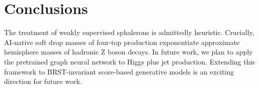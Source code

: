 \section{Conclusions}\label{sec:conclusions}

The treatment of weakly supervised sphalerons is admittedly heuristic.
Crucially, AI-native soft drop masses of four-top production
exponentiate approximate hemisphere masses of hadronic Z boson decays.
In future work, we plan to apply the pretrained graph neural network to
Higgs plus jet production. Extending this framework to BRST-invariant
score-based generative models is an exciting direction for future work.

